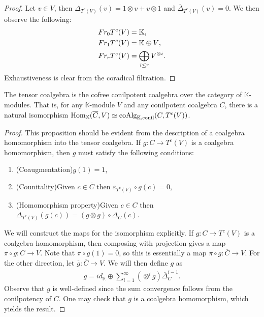 \documentclass[../thesis.tex]{subfiles}
\begin{document}
            \begin{proof}
                Let $v\in V$, then $\Delta_{T^c(V)}(v)=1\otimes v + v\otimes 1$ and $\overline{\Delta}_{T^c(V)}(v)=0$. We then observe the following:
                \begin{align*}
                    Fr_0T^c(V) & = \mathbb{K}\tt{,} \\
                    Fr_1T^c(V) & = \mathbb{K} \oplus V\tt{,} \\
                    Fr_rT^c(V) & = \bigoplus_{i\leq r} V^{\otimes i}\tt{.}
                \end{align*}
                Exhaustiveness is clear from the coradical filtration.
            \end{proof}

            \begin{proposition}\label{prop: cofree-tensor}
                The tensor coalgebra is the cofree conilpotent coalgebra over the category of $\mathbb{K}$-modules. That is, for any $\mathbb{K}$-module $V$ and any conilpotent coalgebra $C$, there is a natural isomorphism $\tt{Hom}_{\mathbb{K}}(\overline{C}, V)\simeq \tt{coAlg}_{\mathbb{K},\tt{conil}}(C, T^c(V))$.
            \end{proposition}

            \begin{proof}
                This proposition should be evident from the description of a coalgebra homomorphism into the tensor coalgebra. If $g:C\rightarrow T^c(V)$ is a coalgebra homomorphism, then $g$ must satisfy the following conditions:
                \begin{enumerate}
                    \item (Coaugmentation)\quad $g(1)=1$,
                    \item (Counitality)\quad Given $c\in \overline{C}$ then $\varepsilon_{T^c(V)}\circ g(c)=0$,
                    \item (Homomorphism property)\quad Given $c\in C$ then $\Delta_{T^c(V)}(g(c))=(g\otimes g)\circ\Delta_C(c)$.
                \end{enumerate}

                We will construct the maps for the isomorphism explicitly. If $g: C\rightarrow T^c(V)$ is a coalgebra homomorphism, then composing with projection gives a map $\pi\circ g: C\rightarrow V$. Note that $\pi\circ g(1)=0$, so this is essentially a map $\pi\circ g:\overline{C}\rightarrow V$. For the other direction, let $\overline{g}:\overline{C}\rightarrow V$. We will then define $g$ as
                \begin{align*}
                    g = id_{\mathbb{K}} \oplus \sum_{i=1}^{\infty}(\otimes^{i}\overline{g})\overline{\Delta}_C^{i-1}.
                \end{align*}
                Observe that $g$ is well-defined since the sum convergence follows from the conilpotency of $C$. One may check that $g$ is a coalgebra homomorphism, which yields the result.
            \end{proof}
\end{document}
